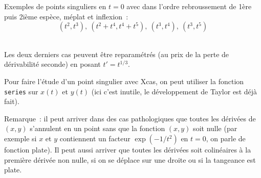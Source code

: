 \documentclass[a4paper,11pt]{book}
\begin{document}
\begin{giacjshere}
Exemples de points singuliers en $t=0$ avec dans l'ordre rebroussement
de 1\`ere puis 2i\`eme esp\`ece, m\'eplat et inflexion~: 
$$ (t^2,t^3), \ (t^2+t^4,t^4+t^5), \ (t^3,t^4), \ (t^3,t^5) $$\\



Les deux derniers cas peuvent \^etre reparam\'etr\'es (au prix
de la perte de d\'erivabilit\'e seconde) en posant $t'=t^{1/3}$.

Pour faire l'\'etude d'un point singulier avec Xcas, on peut utiliser
la fonction \verb|series| sur $x(t)$ et $y(t)$ (ici c'est inutile,
le d\'eveloppement de Taylor est d\'ej\`a fait).

Remarque~: il peut arriver dans des cas pathologiques
que toutes les d\'eriv\'ees de $(x,y)$ s'annulent en
un point sans que la fonction $(x,y)$ soit nulle (par exemple si $x$
et $y$ contiennent un facteur $\exp(-1/t^2)$ en $t=0$, on parle
de fonction plate). Il peut aussi
arriver que toutes les d\'eriv\'ees soit colin\'eaires \`a la
premi\`ere d\'eriv\'ee non nulle, si on se d\'eplace sur une droite
ou si la tangeance est plate.


\end{giacjshere}
\end{document}
